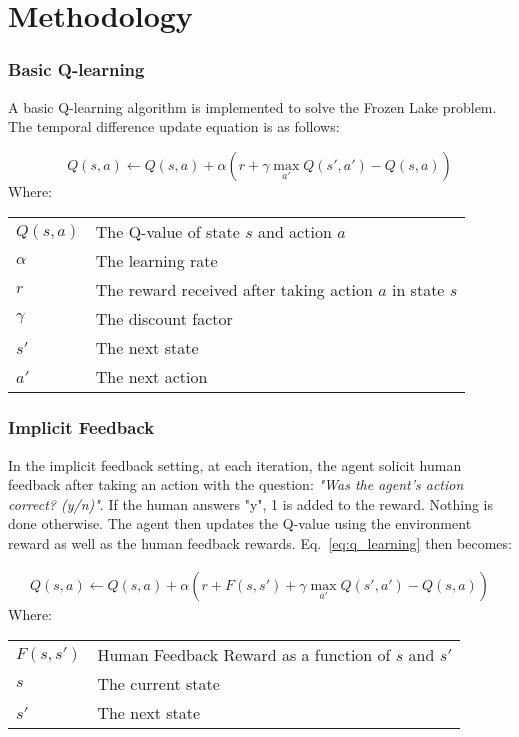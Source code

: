 \documentclass[conference]{IEEEtran}
\makeatletter
\newenvironment{conditions}
  {\par\vspace{\abovedisplayskip}\noindent\begin{tabular}{>{$}l<{$} @{${}={}$} l}}
  {\end{tabular}\par\vspace{\belowdisplayskip}}
\makeatother
\begin{document}
\section{Methodology}

\subsubsection{Basic Q-learning}

A basic Q-learning\cite{watkinsQlearning1992} algorithm is implemented to solve the Frozen Lake problem. The temporal difference update equation is as follows:

\begin{equation}
    Q(s, a) \leftarrow Q(s, a) + \alpha \left( r + \gamma \max_{a'} Q(s', a') - Q(s, a) \right)
    \label{eq:q_learning}
\end{equation}
Where:
\begin{conditions}
    Q(s, a) & The Q-value of state \(s\) and action \(a\) \\
    \alpha  & The learning rate \\
    r       & The reward received after taking action \(a\) in state \(s\) \\
    \gamma  & The discount factor \\
    s'      & The next state \\
    a'      & The next action
\end{conditions}

\subsubsection{Implicit Feedback}

In the implicit feedback setting, at each iteration, the agent solicit human feedback after taking an action with the question: \textit{"Was the agent's action correct? (y/n)"}. If the human answers "y", 1 is added to the reward. Nothing is done otherwise. The agent then updates the Q-value using the environment reward as well as the human feedback rewards. Eq.~\ref{eq:q_learning} then becomes:

\begin{equation}
    \begin{split}
        Q(s, a) \leftarrow Q(s, a) + \alpha \left( r + F(s, s') + \gamma \max_{a'} Q(s', a') - Q(s, a) \right)
        \label{eq:implicit_feedback}
    \end{split}
\end{equation}
Where:
\begin{conditions}
    F(s, s') & Human Feedback Reward as a function of \(s\) and \(s'\) \\
    s        & The current state \\
    s'       & The next state \\
\end{conditions}
\end{document}
